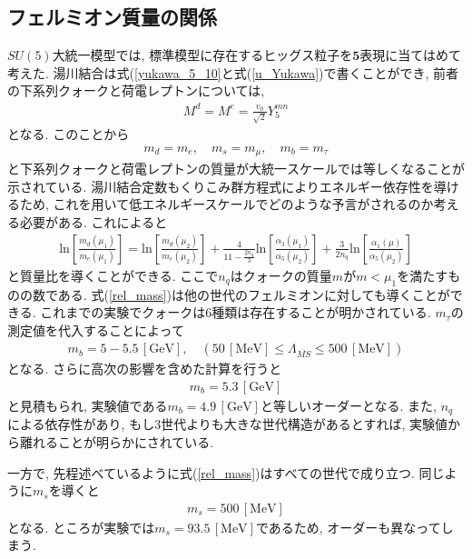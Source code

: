 \subsection{フェルミオン質量の関係}
$SU(5)$大統一模型では, 標準模型に存在するヒッグス粒子を$\bm{5}$表現に当てはめて考えた.
湯川結合は式(\ref{yukawa_5_10}と式(\ref{u_Yukawa})で書くことができ, 前者の下系列クォークと荷電レプトンについては, 
\begin{align}
  M^d = M^e = \frac{v_0}{\sqrt{2}}Y_5^{mn}
\end{align}
となる.
このことから
\begin{align}
  m_d = m_e,\quad m_s = m_\mu,\quad m_b = m_\tau \label{Same_mass}
\end{align}
と下系列クォークと荷電レプトンの質量が大統一スケールでは等しくなることが示されている.
湯川結合定数もくりこみ群方程式によりエネルギー依存性を導けるため, これを用いて低エネルギースケールでどのような予言がされるのか考える必要がある.
これによると\cite{burasAspectsGrandUnification1978,chanowitzPriceNaturalFlavour1977}
\begin{align}
  \mathrm{ln}\left[ \frac{m_d(\mu_1)}{m_e(\mu_1)}\right]=\mathrm{ln}\left[ \frac{m_d(\mu_2)}{m_e(\mu_2)}\right] + \frac{4}{11-\frac{2n_q}{3}}\mathrm{ln}\left[ \frac{\alpha_3(\mu_1)}{\alpha_5(\mu_2)}\right]+\frac{3}{2n_q}\mathrm{ln}\left[\frac{\alpha_1(\mu)}{\alpha_5(\mu_2)}\right]\label{rel_mass}
\end{align}
と質量比を導くことができる.
ここで$n_q$はクォークの質量$m$が$m<\mu_1$を満たすものの数である.
式(\ref{rel_mass})は他の世代のフェルミオンに対しても導くことができる.
これまでの実験でクォークは6種類は存在することが明かされている.
$m_\tau$の測定値を代入することによって
\begin{align}
  m_b = 5-5.5\,[\mathrm{GeV}],\quad (50\,[\mathrm{MeV}]\leq \Lambda_{\overline{MS}} \leq 500\,[\mathrm{MeV}])
\end{align}
となる.
さらに高次の影響を含めた計算を行うと
\begin{align}
  m_b = 5.3\,[\mathrm{GeV}]
\end{align}
と見積もられ, 実験値である$m_b = 4.9\,[\mathrm{GeV}]$と等しいオーダーとなる.
また, $n_q$による依存性があり, もし3世代よりも大きな世代構造があるとすれば, 実験値から離れることが明らかにされている\cite{nanopoulosLimitsNumberFlavours1979,burasAspectsGrandUnification1978}.

一方で, 先程述べているように式(\ref{rel_mass})はすべての世代で成り立つ.
同じように$m_s$を導くと
\begin{align}
  m_s = 500\,[\mathrm{MeV}]
\end{align}
となる.
ところが実験では$m_s = 93.5\,[\mathrm{MeV}]$であるため, オーダーも異なってしまう.

